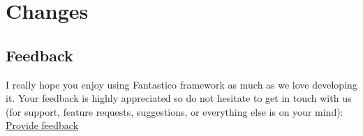 \documentclass[letterpaper,10pt,english]{sphinxmanual}
\begin{document}
\chapter{Changes}
\label{changes:changes}\label{changes::doc}

\section{Feedback}
\label{changes:feedback}
I really hope you enjoy using Fantastico framework as much as we love developing it. Your feedback is highly appreciated
so do not hesitate to get in touch with us (for support, feature requests, suggestions, or everything else is on your mind):
\href{https://docs.google.com/forms/d/1tKBopU3lfDB\_w8F4h7Rl1Rn4uydAJq-nha09L\_ptJck/edit?usp=sharing}{Provide feedback}
\end{document}

